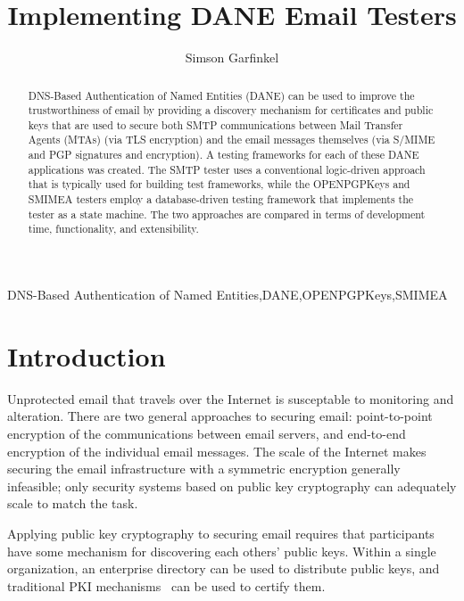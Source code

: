 \documentclass[preprint,3p,11pt]{elsarticle}
\begin{document}
\begin{frontmatter}

\title{Implementing DANE Email Testers}

\author{Simson Garfinkel}

\begin{abstract}
DNS-Based Authentication of Named Entities (DANE) can be used to
improve the trustworthiness of email by providing a discovery
mechanism for certificates and public keys that are used to secure
both SMTP communications between Mail Transfer Agents (MTAs) (via TLS
encryption) and the email messages themselves (via S/MIME and PGP
signatures and encryption). A testing frameworks for each of these
DANE applications was created. The SMTP tester uses a conventional
logic-driven approach that is typically used for building test frameworks, while the OPENPGPKeys and
SMIMEA testers employ a database-driven testing framework that
implements the tester as a state machine. The two approaches are
compared in terms of development time, functionality, and
extensibility.
\end{abstract}

\begin{keyword}
DNS-Based Authentication of Named Entities\sep DANE\sep OPENPGPKeys\sep SMIMEA
\end{keyword}

\end{frontmatter}

\tableofcontents


\section{Introduction}

Unprotected email that travels over the Internet is susceptable to monitoring and
alteration. There are two general approaches to securing email:
point-to-point encryption of the communications between email
servers, and end-to-end encryption of the individual email
messages. The scale of the Internet makes securing the email
infrastructure with a symmetric encryption generally infeasible; only security systems based
on public key cryptography can adequately scale to match the task.

Applying public key cryptography to securing email requires that participants have some mechanism
for discovering each others' public keys. Within a single organization,
an enterprise directory can be used to distribute public
keys, and traditional PKI mechanisms~\cite{rfc5280} can be used to certify them. 
\end{document}
